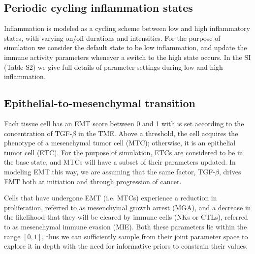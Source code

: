 \documentclass[11pt]{article}
\begin{document}
\subsection{Periodic cycling inflammation states} 
Inflammation is modeled as a cycling scheme between low and high inflammatory states, with varying on/off durations and intensities.
For the purpose of simulation we consider the default state to be low inflammation, and update the immune activity parameters whenever a switch to the high state occurs.
In the SI (Table S2) we give full details of parameter settings during low and high inflammation.

\subsection{Epithelial-to-mesenchymal transition}\label{EMT}
Each tissue cell has an EMT score between 0 and 1 with is set according to the concentration of TGF-$\beta$ in the TME. Above a threshold, the cell acquires the phenotype of a mesenchymal tumor cell (MTC); otherwise, it is an epithelial tumor cell (ETC).
For the purpose of simulation, ETCs are considered to be in the base state, and MTCs will have a subset of their parameters updated.
In modeling EMT this way, we are assuming that the same factor, TGF-$\beta$, drives EMT both at initiation and through progression of cancer.

\par
Cells that have undergone EMT (i.e. MTCs) experience a reduction in proliferation, referred to as mesenchymal growth arrest (MGA), and a decrease in the likelihood that they will be cleared by immune cells (NKs or CTLs), referred to as mesenchymal immune evasion (MIE). Both these parameters lie within the range $[0,1]$, thus we can sufficiently sample from their joint parameter space to explore it in depth with the need for informative priors to constrain their values.
\end{document}
